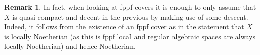 \documentclass[11pt]{amsart}
\theoremstyle{plain}
\theoremstyle{definition}
\newtheorem{remark}[theorem]{Remark}
\numberwithin{equation}{section}
\numberwithin{theorem}{section}
\begin{document}
\begin{appendix}
\begin{remark}
    In fact, when looking at fppf covers it is enough to only assume that $X$ is quasi-compact and decent in the previous by making use of some descent. 
    Indeed, it follows from the existence of an fppf cover as in the statement that $X$ is locally Noetherian (as this is fppf local and regular algebraic spaces are always locally Noetherian) and hence Noetherian.
\end{remark}

\end{appendix}



\end{document}
